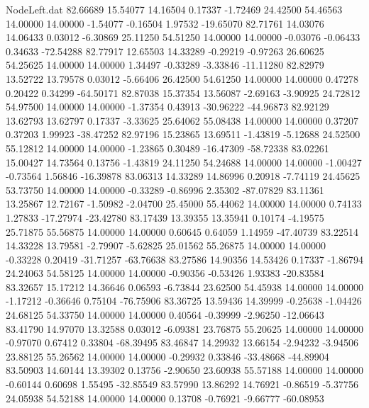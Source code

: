 \begin{filecontents}{NodeLeft.dat}
  82.66689   15.54077   14.16504     0.17337   -1.72469   24.42500   54.46563   14.00000   14.00000   -1.54077   -0.16504    1.97532  -19.65070
  82.71761   14.03076   14.06433     0.03012   -6.30869   25.11250   54.51250   14.00000   14.00000   -0.03076   -0.06433    0.34633  -72.54288
  82.77917   12.65503   14.33289    -0.29219   -0.97263   26.60625   54.25625   14.00000   14.00000    1.34497   -0.33289   -3.33846  -11.11280
  82.82979   13.52722   13.79578     0.03012   -5.66406   26.42500   54.61250   14.00000   14.00000    0.47278    0.20422    0.34299  -64.50171
  82.87038   15.37354   13.56087    -2.69163   -3.90925   24.72812   54.97500   14.00000   14.00000   -1.37354    0.43913  -30.96222  -44.96873
  82.92129   13.62793   13.62797     0.17337   -3.33625   25.64062   55.08438   14.00000   14.00000    0.37207    0.37203    1.99923  -38.47252
  82.97196   15.23865   13.69511    -1.43819   -5.12688   24.52500   55.12812   14.00000   14.00000   -1.23865    0.30489  -16.47309  -58.72338
  83.02261   15.00427   14.73564     0.13756   -1.43819   24.11250   54.24688   14.00000   14.00000   -1.00427   -0.73564    1.56846  -16.39878
  83.06313   14.33289   14.86996     0.20918   -7.74119   24.45625   53.73750   14.00000   14.00000   -0.33289   -0.86996    2.35302  -87.07829
  83.11361   13.25867   12.72167    -1.50982   -2.04700   25.45000   55.44062   14.00000   14.00000    0.74133    1.27833  -17.27974  -23.42780
  83.17439   13.39355   13.35941     0.10174   -4.19575   25.71875   55.56875   14.00000   14.00000    0.60645    0.64059    1.14959  -47.40739
  83.22514   14.33228   13.79581    -2.79907   -5.62825   25.01562   55.26875   14.00000   14.00000   -0.33228    0.20419  -31.71257  -63.76638
  83.27586   14.90356   14.53426     0.17337   -1.86794   24.24063   54.58125   14.00000   14.00000   -0.90356   -0.53426    1.93383  -20.83584
  83.32657   15.17212   14.36646     0.06593   -6.73844   23.62500   54.45938   14.00000   14.00000   -1.17212   -0.36646    0.75104  -76.75906
  83.36725   13.59436   14.39999    -0.25638   -1.04426   24.68125   54.33750   14.00000   14.00000    0.40564   -0.39999   -2.96250  -12.06643
  83.41790   14.97070   13.32588     0.03012   -6.09381   23.76875   55.20625   14.00000   14.00000   -0.97070    0.67412    0.33804  -68.39495
  83.46847   14.29932   13.66154    -2.94232   -3.94506   23.88125   55.26562   14.00000   14.00000   -0.29932    0.33846  -33.48668  -44.89904
  83.50903   14.60144   13.39302     0.13756   -2.90650   23.60938   55.57188   14.00000   14.00000   -0.60144    0.60698    1.55495  -32.85549
  83.57990   13.86292   14.76921    -0.86519   -5.37756   24.05938   54.52188   14.00000   14.00000    0.13708   -0.76921   -9.66777  -60.08953

\end{filecontents}
